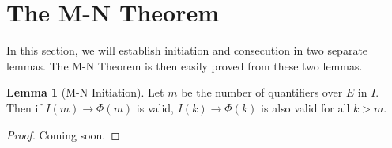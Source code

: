 \documentclass[12pt]{article}
\theoremstyle{definition}
\newtheorem{lemma}{Lemma}
\theoremstyle{remark}
\begin{document}
\section{The M-N Theorem}

In this section, we will establish initiation and consecution in two separate lemmas.  The M-N Theorem is then easily proved from these two lemmas.

\begin{lemma}[M-N Initiation]
  \label{ref:initiation}
  Let $m$ be the number of quantifiers over $E$ in $I$.  Then if $I(m) \rightarrow \Phi(m)$ is valid, $I(k) \rightarrow \Phi(k)$ is also valid for all $k>m$.
\end{lemma}
\begin{proof}
  Coming soon.
\end{proof}
\end{document}
